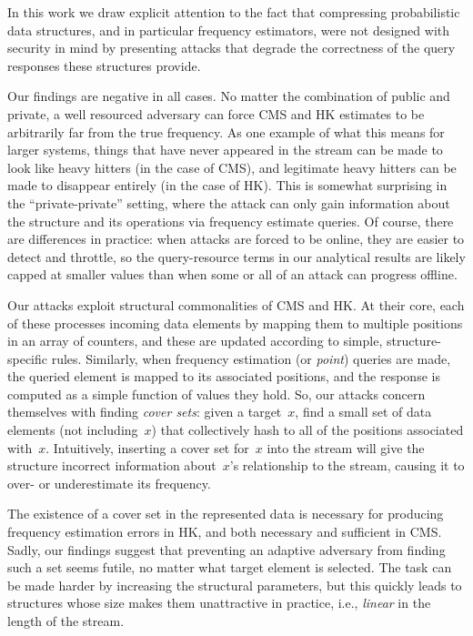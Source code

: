 In this work we draw explicit attention to the fact that compressing probabilistic data structures, and in particular frequency estimators, were not designed with security in mind by presenting attacks that degrade the correctness of the query responses these structures provide.  

Our findings are negative in all cases.  No matter the combination of public and private, a well resourced adversary can force CMS and HK estimates to be arbitrarily far from the true frequency. As one example of what this means for larger systems, things that have never appeared in the stream can be made to look like heavy hitters (in the case of CMS), and legitimate heavy hitters can be made to disappear entirely (in the case of HK).  This is somewhat surprising in the ``private-private'' setting, where the attack can only gain information about the structure and its operations via frequency estimate queries.  Of course, there are differences in practice: when attacks are forced to be online, they are easier to detect and throttle, so the query-resource terms in our analytical results are likely capped at smaller values than when some or all of an attack can progress offline. 

Our attacks exploit structural commonalities of CMS and HK.  At their core, each of these processes incoming data elements by mapping them to multiple positions in an array of counters, and these are updated according to simple, structure-specific rules. Similarly, 
when frequency estimation (or \emph{point}) queries are made, the queried element is mapped to its associated positions, and the response is computed as a simple function of values they hold.  So, our attacks concern themselves with finding \emph{cover sets}: given a target~$x$, find a small set of data elements (not including~$x$) that collectively hash to all of the positions associated with~$x$. Intuitively, inserting a cover set for~$x$ into the stream will give the structure incorrect information about~$x$'s relationship to the stream, causing it to over- or underestimate its frequency. 

The existence of a cover set in the represented data is necessary for producing frequency estimation errors in HK, and both necessary and sufficient in CMS.  Sadly, our findings suggest that preventing an adaptive adversary from finding such a set seems futile, no matter what target element is selected.  The task can be made harder by increasing the structural parameters, but this quickly leads to structures whose size makes them unattractive in practice, i.e., \emph{linear} in the length of the stream.

